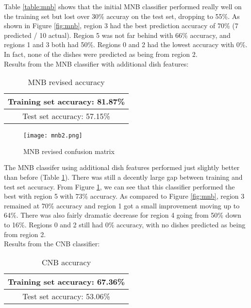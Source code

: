 \documentclass[12pt]{article}
\begin{document}
\noindent Table \ref{table:mnb} shows that the initial MNB classifier performed really well on the training set but lost over 30\% accuray on the test set, dropping to 55\%. As shown in Figure \ref{fig:mnb}, region 3 had the best prediction accuracy of 70\% (7 predicted / 10 actual). Region 5 was not far behind with 66\% accuracy, and regions 1 and 3 both had 50\%. Regions 0 and 2 had the lowest accuracy with 0\%. In fact, none of the dishes were predicted as being from region 2.\\


\noindent Results from the MNB classifier with additional dish features:\\
\begin{table}[H]
   \centering
\begin{tabular}{ |c| } 
 \hline
 Training set accuracy: 81.87\% \\ 
 \hline
 Test set accuracy: 57.15\% \\ 
 \hline
\end{tabular}
\caption{MNB revised accuracy}
\label{table:mnb2}
\end{table}

\begin{figure}[H]
   \centering
   \texttt{[image: mnb2.png]}
      \caption{MNB revised confusion matrix}
   \label{fig:mnb2}
\end{figure}

\noindent The MNB classifer using additional dish features performed just slightly better than before (Table \ref{table:mnb2}). There was still a decently large gap between training and test set accuracy. From Figure \ref{fig:mnb2}, we can see that this classifier performed the best with region 5 with 73\% accuracy. As compared to Figure \ref{fig:mnb}, region 3 remained at 70\% accuracy and region 1 got a small improvement moving up to 64\%. There was also fairly dramatic decrease for region 4 going from 50\% down to 16\%. Regions 0 and 2 still had 0\% accuracy, with no dishes predicted as being from region 2.\\

\noindent Results from the CNB classifier:\\
\begin{table}[H]
   \centering
\begin{tabular}{ |c| } 
 \hline
 Training set accuracy: 67.36\% \\ 
 \hline
 Test set accuracy: 53.06\% \\ 
 \hline
\end{tabular}
\caption{CNB accuracy}
\label{table:cnb}
\end{table}
\end{document}
